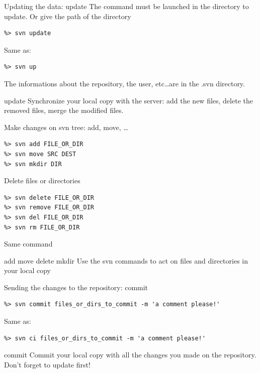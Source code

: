 \documentclass[12pt]{beamer}
\begin{document}
\begin{frame}[fragile]
	\begin{block}{Updating the data: update}
		The command must be launched in the directory to update. Or give the path of the directory
		\begin{verbatim}
%> svn update
		\end{verbatim}
		Same as:
		\begin{verbatim}
%> svn up
		\end{verbatim}
		The informations about the repository, the user, etc\ldots are in the .svn directory.
	\end{block}
	\begin{exampleblock}{update}
		 Synchronize your local copy with the server: add the new files, delete the removed files, merge the modified files.
	\end{exampleblock}
\end{frame}

\begin{frame}[fragile]
	\begin{block}{Make changes on svn tree: add, move, \ldots}
		\begin{verbatim}
%> svn add FILE_OR_DIR
%> svn move SRC DEST
%> svn mkdir DIR
		\end{verbatim}
	\end{block}
	\begin{block}{Delete files or directories}
		\begin{verbatim}
%> svn delete FILE_OR_DIR
%> svn remove FILE_OR_DIR
%> svn del FILE_OR_DIR
%> svn rm FILE_OR_DIR
		\end{verbatim}
		Same command
	\end{block}
	\begin{exampleblock}{add move delete mkdir}
		 Use the svn commands to act on files and directories in your local copy
	\end{exampleblock}
\end{frame}

\begin{frame}[fragile]
	\begin{block}{Sending the changes to the repository: commit}
		\begin{verbatim}
%> svn commit files_or_dirs_to_commit -m 'a comment please!'
		\end{verbatim}
		Same as:
		\begin{verbatim}
%> svn ci files_or_dirs_to_commit -m 'a comment please!'
		\end{verbatim}
	\end{block}
	\begin{exampleblock}{commit}
		 Commit your local copy with all the changes you made on the repository. Don't forget to update first!
	\end{exampleblock}
\end{frame}
\end{document}
